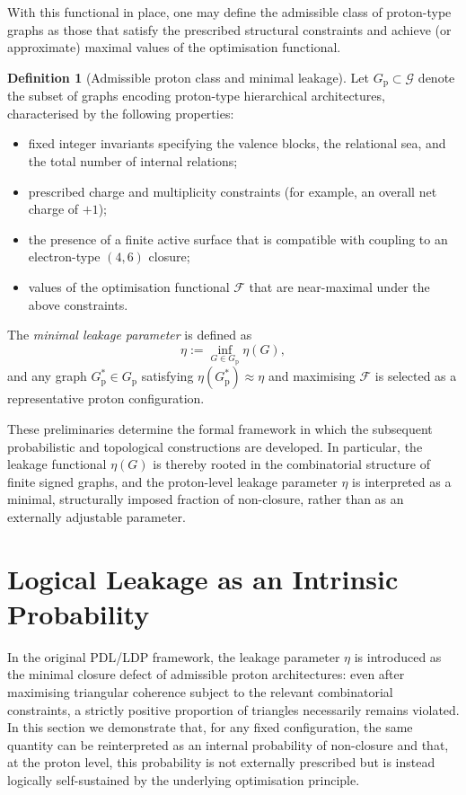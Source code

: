 \documentclass[11pt,a4paper]{article}
\theoremstyle{definition}
\newtheorem{definition}[theorem]{Definition}
\newcommand{\Gprot}{G_{\mathrm{p}}}
\newcommand{\etaL}{\eta} %
\newcommand{\Fopt}{\mathcal{F}} %
\begin{document}
With this functional in place, one may define the admissible class of proton-type graphs as those that satisfy the prescribed structural constraints and achieve (or approximate) maximal values of the optimisation functional.

\begin{definition}[Admissible proton class and minimal leakage]
Let \(\Gprot \subset \mathcal{G}\) denote the subset of graphs encoding proton-type hierarchical architectures, characterised by the following properties:
\begin{itemize}
\item fixed integer invariants specifying the valence blocks, the relational sea, and the total number of internal relations;
\item prescribed charge and multiplicity constraints (for example, an overall net charge of \(+1\));
\item the presence of a finite active surface that is compatible with coupling to an electron-type \((4,6)\) closure;
\item values of the optimisation functional \(\Fopt\) that are near-maximal under the above constraints.
\end{itemize}
The \emph{minimal leakage parameter} is defined as
\[
 \etaL := \inf_{G \in \Gprot} \eta(G),
\]
and any graph \(G^\ast_{\mathrm{p}} \in \Gprot\) satisfying \(\eta(G^\ast_{\mathrm{p}}) \approx \etaL\) and maximising \(\Fopt\) is selected as a representative proton configuration.
\end{definition}

These preliminaries determine the formal framework in which the subsequent probabilistic and topological constructions are developed. In particular, the leakage functional \(\eta(G)\) is thereby rooted in the combinatorial structure of finite signed graphs, and the proton-level leakage parameter \(\etaL\) is interpreted as a minimal, structurally imposed fraction of non-closure, rather than as an externally adjustable parameter.

\section{Logical Leakage as an Intrinsic Probability}

In the original PDL/LDP framework, the leakage parameter \(\etaL\) is introduced as the minimal closure defect of admissible proton architectures: even after maximising triangular coherence subject to the relevant combinatorial constraints, a strictly positive proportion of triangles necessarily remains violated. In this section we demonstrate that, for any fixed configuration, the same quantity can be reinterpreted as an internal probability of non-closure and that, at the proton level, this probability is not externally prescribed but is instead logically self-sustained by the underlying optimisation principle.
\end{document}
